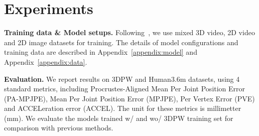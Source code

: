 \section{Experiments}

\label{details}
{\bf Training data \& Model setups.} Following~\citep{hmr:kanazawa2018end, vibe:kocabas2020vibe, maed:wan2021encoder}, we use mixed 3D video, 2D video and 2D image datasets for training. The details of model configurations and training data are described in Appendix~\ref{appendix:model} and Appendix~\ref{appendix:data}. 

{\bf Evaluation.} We report results on 3DPW and Human3.6m datasets,  using 4 standard metrics, including Procrustes-Aligned Mean Per Joint Position Error (PA-MPJPE), Mean Per Joint Position Error (MPJPE), Per Vertex Error (PVE) and ACCELeration error (ACCEL). The unit for these metrics is millimetter (mm). We evaluate the models trained w/ and wo/ 3DPW training set for comparison with previous methods.



